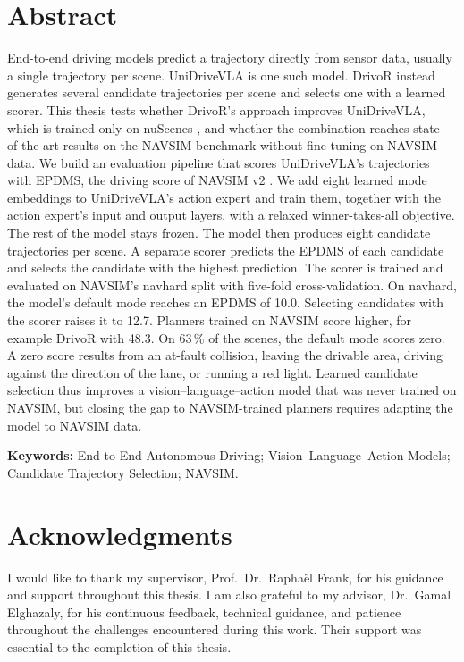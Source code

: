 \documentclass[11pt, a4paper, oneside]{book}
\begin{document}
\frontmatter



\section*{Abstract}
End-to-end driving models predict a trajectory directly from sensor data, usually a single
trajectory per scene. UniDriveVLA \cite{unidrivevla} is one such model. DrivoR \cite{drivor}
instead generates several candidate trajectories per scene and selects one with a learned
scorer. This thesis tests whether DrivoR's approach improves UniDriveVLA, which is trained only on
nuScenes \cite{nuscenes}, and whether the combination reaches state-of-the-art results on the
NAVSIM benchmark \cite{navsim} without fine-tuning on NAVSIM data. We build an evaluation pipeline that scores
UniDriveVLA's trajectories with EPDMS, the driving score of NAVSIM v2 \cite{pseudosim}. We add eight learned mode
embeddings to UniDriveVLA's action expert and train them, together with the action expert's
input and output layers, with a relaxed winner-takes-all objective. The rest of the model stays frozen.
The model then produces eight candidate trajectories per
scene. A separate scorer predicts the EPDMS of each candidate and selects the candidate with
the highest prediction. The scorer is trained and evaluated on NAVSIM's navhard split with
five-fold cross-validation. On navhard, the model's default mode reaches an EPDMS of 10.0.
Selecting candidates with the scorer raises it to 12.7. Planners trained on NAVSIM score higher, for example DrivoR with
48.3. On 63\,\% of the scenes, the default mode scores zero. A zero score results from an
at-fault collision, leaving the drivable area, driving against the direction of the lane, or
running a red light. Learned candidate selection thus improves a vision--language--action model
that was never trained on NAVSIM, but closing the gap to NAVSIM-trained planners requires
adapting the model to NAVSIM data.

\vspace{1em}
\noindent\textbf{Keywords:} End-to-End Autonomous Driving; Vision--Language--Action Models;
Candidate Trajectory Selection; NAVSIM.
\clearpage

\section*{Acknowledgments}
I would like to thank my supervisor, Prof.~Dr.~Rapha\"el Frank, for his guidance and support
throughout this thesis. I am also grateful to my advisor, Dr.~Gamal Elghazaly, for his
continuous feedback, technical guidance, and patience throughout the challenges encountered
during this work. Their support was essential to the completion of this thesis.
\end{document}
